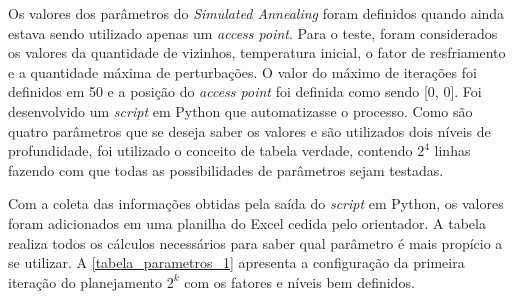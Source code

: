 \documentclass[
	12pt,				%
	twoside,			%
	a4paper,			%
	english,			%
	french,				%
	spanish,			%
	brazil				%
	]{abntex2}
\begin{document}
Os valores dos parâmetros do \emph{Simulated Annealing} foram definidos
quando ainda estava sendo utilizado apenas um \emph{access point}. Para
o teste, foram considerados os valores da quantidade de vizinhos,
temperatura inicial, o fator de resfriamento e a quantidade máxima de
perturbações. O valor do máximo de iterações foi definidos em 50 e a
posição do \emph{access point} foi definida como sendo {[}0, 0{]}. Foi
desenvolvido um \emph{script} em Python que automatizasse o processo.
Como são quatro parâmetros que se deseja saber os valores e são
utilizados dois níveis de profundidade, foi utilizado o conceito de
tabela verdade, contendo \(2^{4}\) linhas fazendo com que todas as
possibilidades de parâmetros sejam testadas.

Com a coleta das informações obtidas pela saída do \emph{script} em
Python, os valores foram adicionados em uma planilha do Excel cedida
pelo orientador. A tabela realiza todos os cálculos necessários para
saber qual parâmetro é mais propício a se utilizar. A
\autoref{tabela_parametros_1} apresenta a configuração da primeira
iteração do planejamento \(2^{k}\) com os fatores e níveis bem
definidos.

\begin{table}[ht]
    \centering
    \caption{Fatores para parâmetro para o \textit{Simulated Annealing} na primeira iteração.}
    \label{tabela_parametros_1}
\end{table}
\end{document}
